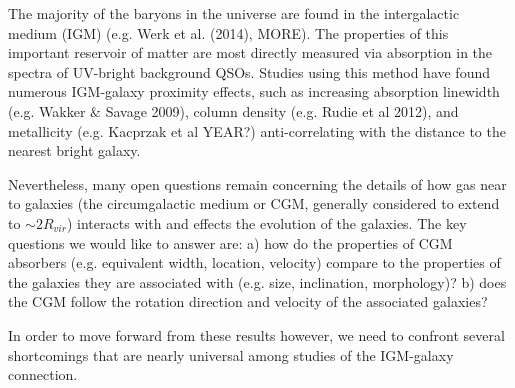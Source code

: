 \documentclass[12pt]{article}
\begin{document}
%
%
\justification          %


\indent \indent The majority of the baryons in the universe are found in the intergalactic medium (IGM) (e.g. Werk et al. (2014), MORE). The properties of this important reservoir of matter are most directly measured via absorption in the spectra of UV-bright background QSOs. Studies using this method have found numerous IGM-galaxy proximity effects, such as increasing absorption linewidth (e.g. Wakker $\&$ Savage 2009), column density (e.g. Rudie et al 2012), and metallicity (e.g. Kacprzak et al YEAR?) anti-correlating with the distance to the nearest bright galaxy. 

Nevertheless, many open questions remain concerning the details of how gas near to galaxies (the circumgalactic medium or CGM, generally considered to extend to $\sim 2R_{vir}$) interacts with and effects the evolution of the galaxies. The key questions we would like to answer are:
a) how do the properties of CGM absorbers (e.g. equivalent width, location, velocity) compare to the properties of the galaxies they are associated with (e.g. size, inclination, morphology)?
b) does the CGM follow the rotation direction and velocity of the associated galaxies?

In order to move forward from these results however, we need to confront several shortcomings that are nearly universal among studies of the IGM-galaxy connection. \\
\end{document}
